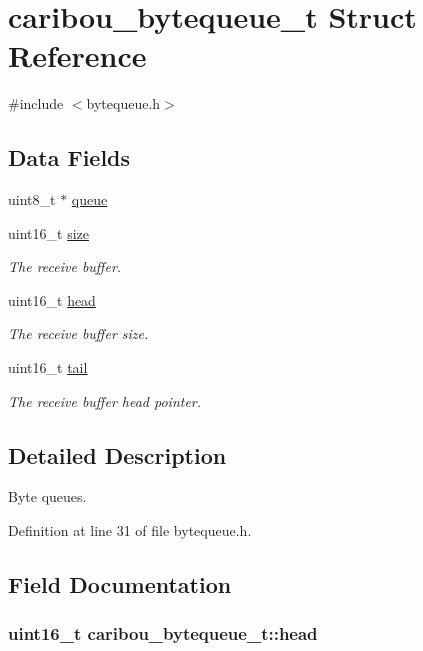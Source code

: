 \hypertarget{structcaribou__bytequeue__t}{\section{caribou\-\_\-bytequeue\-\_\-t Struct Reference}
\label{structcaribou__bytequeue__t}
}


{\ttfamily \#include $<$bytequeue.\-h$>$}

\subsection*{Data Fields}
\begin{DoxyCompactItemize}
\item 
uint8\-\_\-t $\ast$ \hyperlink{structcaribou__bytequeue__t_a4a4aa3f8ed5e7e7e66f7da7a2cb7720e}{queue}
\item 
uint16\-\_\-t \hyperlink{structcaribou__bytequeue__t_a0f88b0ee081def2ac171173e3e520980}{size}
\begin{DoxyCompactList}\small\item\em The receive buffer. \end{DoxyCompactList}\item 
uint16\-\_\-t \hyperlink{structcaribou__bytequeue__t_a5dc9b7ce1ee37c0ca3dc5cb37650aa4b}{head}
\begin{DoxyCompactList}\small\item\em The receive buffer size. \end{DoxyCompactList}\item 
uint16\-\_\-t \hyperlink{structcaribou__bytequeue__t_a566eaeca029373cd7f187cc2e622b3f8}{tail}
\begin{DoxyCompactList}\small\item\em The receive buffer head pointer. \end{DoxyCompactList}\end{DoxyCompactItemize}


\subsection{Detailed Description}
Byte queues. 

Definition at line 31 of file bytequeue.\-h.



\subsection{Field Documentation}
\hypertarget{structcaribou__bytequeue__t_a5dc9b7ce1ee37c0ca3dc5cb37650aa4b}{
\subsubsection[{head}]{\setlength{\rightskip}{0pt plus 5cm}uint16\-\_\-t caribou\-\_\-bytequeue\-\_\-t\-::head}}\label{structcaribou__bytequeue__t_a5dc9b7ce1ee37c0ca3dc5cb37650aa4b}


